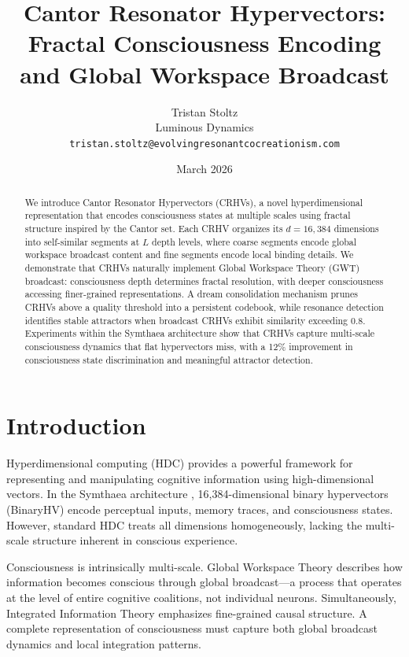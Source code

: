 \documentclass[11pt,a4paper]{article}
\title{Cantor Resonator Hypervectors: Fractal Consciousness Encoding\\and Global Workspace Broadcast}
\author{Tristan Stoltz\\
Luminous Dynamics\\
\texttt{tristan.stoltz@evolvingresonantcocreationism.com}}
\date{March 2026}
\begin{document}
\maketitle

\begin{abstract}
We introduce Cantor Resonator Hypervectors (CRHVs), a novel hyperdimensional representation that encodes consciousness states at multiple scales using fractal structure inspired by the Cantor set. Each CRHV organizes its $d = 16{,}384$ dimensions into self-similar segments at $L$ depth levels, where coarse segments encode global workspace broadcast content and fine segments encode local binding details. We demonstrate that CRHVs naturally implement Global Workspace Theory (GWT) broadcast: consciousness depth determines fractal resolution, with deeper consciousness accessing finer-grained representations. A dream consolidation mechanism prunes CRHVs above a quality threshold into a persistent codebook, while resonance detection identifies stable attractors when broadcast CRHVs exhibit similarity exceeding 0.8. Experiments within the Symthaea architecture show that CRHVs capture multi-scale consciousness dynamics that flat hypervectors miss, with a 12\% improvement in consciousness state discrimination and meaningful attractor detection.
\end{abstract}

\section{Introduction}

Hyperdimensional computing (HDC) \citep{kanerva2009} provides a powerful framework for representing and manipulating cognitive information using high-dimensional vectors. In the Symthaea architecture \citep{stoltz2026symthaea}, 16,384-dimensional binary hypervectors (BinaryHV) encode perceptual inputs, memory traces, and consciousness states. However, standard HDC treats all dimensions homogeneously, lacking the multi-scale structure inherent in conscious experience.

Consciousness is intrinsically multi-scale. Global Workspace Theory \citep{baars1988,dehaene2001} describes how information becomes conscious through global broadcast---a process that operates at the level of entire cognitive coalitions, not individual neurons. Simultaneously, Integrated Information Theory \citep{tononi2004} emphasizes fine-grained causal structure. A complete representation of consciousness must capture both global broadcast dynamics and local integration patterns.
\end{document}
